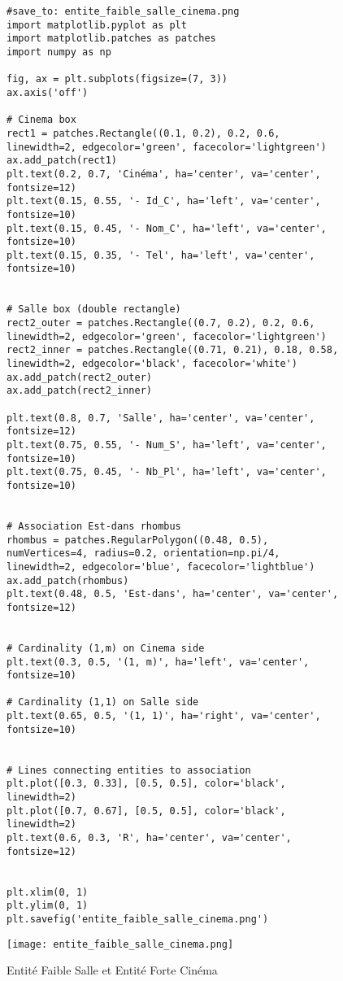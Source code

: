 \documentclass{article}
\begin{document}
\begin{figure}[H]
    \centering
    \begin{verbatim}
#save_to: entite_faible_salle_cinema.png
import matplotlib.pyplot as plt
import matplotlib.patches as patches
import numpy as np

fig, ax = plt.subplots(figsize=(7, 3))
ax.axis('off')

# Cinema box
rect1 = patches.Rectangle((0.1, 0.2), 0.2, 0.6, linewidth=2, edgecolor='green', facecolor='lightgreen')
ax.add_patch(rect1)
plt.text(0.2, 0.7, 'Cinéma', ha='center', va='center', fontsize=12)
plt.text(0.15, 0.55, '- Id_C', ha='left', va='center', fontsize=10)
plt.text(0.15, 0.45, '- Nom_C', ha='left', va='center', fontsize=10)
plt.text(0.15, 0.35, '- Tel', ha='left', va='center', fontsize=10)


# Salle box (double rectangle)
rect2_outer = patches.Rectangle((0.7, 0.2), 0.2, 0.6, linewidth=2, edgecolor='green', facecolor='lightgreen')
rect2_inner = patches.Rectangle((0.71, 0.21), 0.18, 0.58, linewidth=2, edgecolor='black', facecolor='white')
ax.add_patch(rect2_outer)
ax.add_patch(rect2_inner)

plt.text(0.8, 0.7, 'Salle', ha='center', va='center', fontsize=12)
plt.text(0.75, 0.55, '- Num_S', ha='left', va='center', fontsize=10)
plt.text(0.75, 0.45, '- Nb_Pl', ha='left', va='center', fontsize=10)


# Association Est-dans rhombus
rhombus = patches.RegularPolygon((0.48, 0.5), numVertices=4, radius=0.2, orientation=np.pi/4, linewidth=2, edgecolor='blue', facecolor='lightblue')
ax.add_patch(rhombus)
plt.text(0.48, 0.5, 'Est-dans', ha='center', va='center', fontsize=12)


# Cardinality (1,m) on Cinema side
plt.text(0.3, 0.5, '(1, m)', ha='left', va='center', fontsize=10)

# Cardinality (1,1) on Salle side
plt.text(0.65, 0.5, '(1, 1)', ha='right', va='center', fontsize=10)


# Lines connecting entities to association
plt.plot([0.3, 0.33], [0.5, 0.5], color='black', linewidth=2)
plt.plot([0.7, 0.67], [0.5, 0.5], color='black', linewidth=2)
plt.text(0.6, 0.3, 'R', ha='center', va='center', fontsize=12)


plt.xlim(0, 1)
plt.ylim(0, 1)
plt.savefig('entite_faible_salle_cinema.png')

        \end{verbatim}
        \texttt{[image: entite\_faible\_salle\_cinema.png]}
        \caption{Entité Faible Salle et Entité Forte Cinéma}
        \label{fig:entite_faible_salle_cinema}
    \end{figure}
\end{document}

